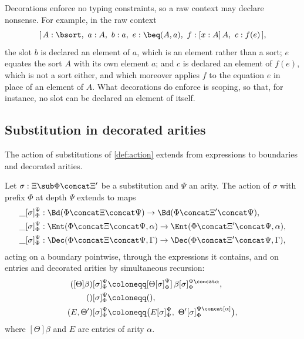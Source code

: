 \begin{example}\label{ex:raw-nonsense}
    Decorations enforce no typing constraints, so a raw context may declare nonsense. For example, in the raw context
    \[
    [\,A : \bsort,\ a : A,\ b : a,\ e : \beq(A, a),\ f : [x : A]\,A,\ c : f(e)\,],
    \]
    the slot $b$ is declared an element of $a$, which is an element rather than a sort; $e$ equates the sort $A$ with its own element $a$; and $c$ is declared an element of $f(e)$, which is not a sort either, and which moreover applies $f$ to the equation $e$ in place of an element of $A$. What decorations do enforce is scoping, so that, for instance, no slot can be declared an element of itself.
\end{example}

\subsection{Substitution in decorated arities}

The action of substitutions of \cref{def:action} extends from expressions to boundaries and decorated arities.

\begin{definition}\label{def:action-decorations}
    Let $\sigma : \Xi \sub \Phi \concat \Xi'$ be a substitution and $\Psi$ an arity. The action of $\sigma$ with prefix $\Phi$ at depth $\Psi$ extends to maps
    \[
    \begin{aligned}
        \_[\sigma]_\Phi^\Psi &: \Bd(\Phi \concat \Xi \concat \Psi) \to \Bd(\Phi \concat \Xi' \concat \Psi),\\
        \_[\sigma]_\Phi^\Psi &: \Ent(\Phi \concat \Xi \concat \Psi, \alpha) \to \Ent(\Phi \concat \Xi' \concat \Psi, \alpha),\\
        \_[\sigma]_\Phi^\Psi &: \Dec(\Phi \concat \Xi \concat \Psi, \Gamma) \to \Dec(\Phi \concat \Xi' \concat \Psi, \Gamma),
    \end{aligned}
    \]
    acting on a boundary pointwise, through the expressions it contains, and on entries and decorated arities by simultaneous recursion:
    \begin{align*}
        ([\Theta]\beta)[\sigma]_\Phi^\Psi &\coloneqq [\Theta[\sigma]_\Phi^\Psi]\,\beta[\sigma]_\Phi^{\Psi \concat \alpha},\\
        ()[\sigma]_\Phi^\Psi &\coloneqq (),\\
        (E, \Theta')[\sigma]_\Phi^\Psi &\coloneqq \big(E[\sigma]_\Phi^\Psi,\ \Theta'[\sigma]_\Phi^{\Psi \concat [\alpha]}\big),
    \end{align*}
    where $[\Theta]\beta$ and $E$ are entries of arity $\alpha$.
\end{definition}

